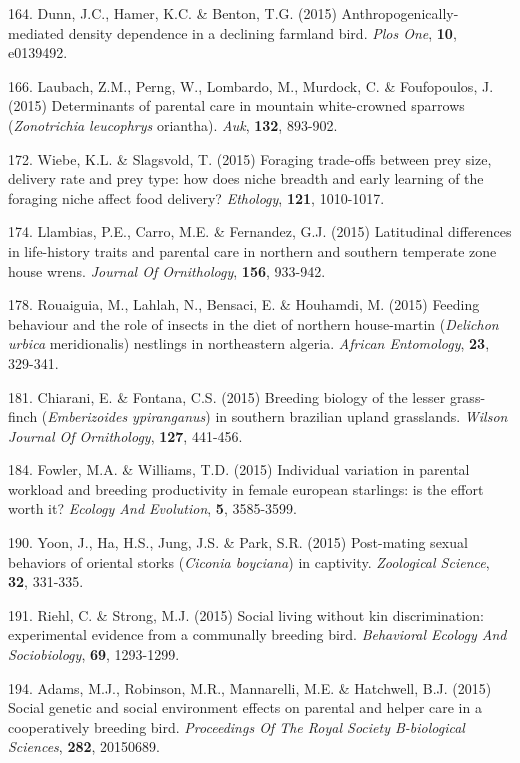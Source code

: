 164. Dunn, J.C., Hamer, K.C. \&  Benton, T.G. (2015) Anthropogenically-mediated density dependence in a declining farmland bird. \textit{Plos One},  \textbf{10}, e0139492.

166. Laubach, Z.M., Perng, W., Lombardo, M., Murdock, C. \&  Foufopoulos, J. (2015) Determinants of parental care in mountain white-crowned sparrows (\textit{Zonotrichia leucophrys} oriantha). \textit{Auk},  \textbf{132}, 893-902.

172. Wiebe, K.L. \&  Slagsvold, T. (2015) Foraging trade-offs between prey size, delivery rate and prey type: how does niche breadth and early learning of the foraging niche affect food delivery? \textit{Ethology},  \textbf{121}, 1010-1017.

174. Llambias, P.E., Carro, M.E. \&  Fernandez, G.J. (2015) Latitudinal differences in life-history traits and parental care in northern and southern temperate zone house wrens. \textit{Journal Of Ornithology},  \textbf{156}, 933-942.

178. Rouaiguia, M., Lahlah, N., Bensaci, E. \&  Houhamdi, M. (2015) Feeding behaviour and the role of insects in the diet of northern house-martin (\textit{Delichon urbica} meridionalis) nestlings in northeastern algeria. \textit{African Entomology},  \textbf{23}, 329-341.

181. Chiarani, E. \&  Fontana, C.S. (2015) Breeding biology of the lesser grass-finch (\textit{Emberizoides ypiranganus}) in southern brazilian upland grasslands. \textit{Wilson Journal Of Ornithology},  \textbf{127}, 441-456.

184. Fowler, M.A. \&  Williams, T.D. (2015) Individual variation in parental workload and breeding productivity in female european starlings: is the effort worth it? \textit{Ecology And Evolution},  \textbf{5}, 3585-3599.

190. Yoon, J., Ha, H.S., Jung, J.S. \&  Park, S.R. (2015) Post-mating sexual behaviors of oriental storks (\textit{Ciconia boyciana}) in captivity. \textit{Zoological Science},  \textbf{32}, 331-335.

191. Riehl, C. \&  Strong, M.J. (2015) Social living without kin discrimination: experimental evidence from a communally breeding bird. \textit{Behavioral Ecology And Sociobiology},  \textbf{69}, 1293-1299.

194. Adams, M.J., Robinson, M.R., Mannarelli, M.E. \&  Hatchwell, B.J. (2015) Social genetic and social environment effects on parental and helper care in a cooperatively breeding bird. \textit{Proceedings Of The Royal Society B-biological Sciences},  \textbf{282}, 20150689.

